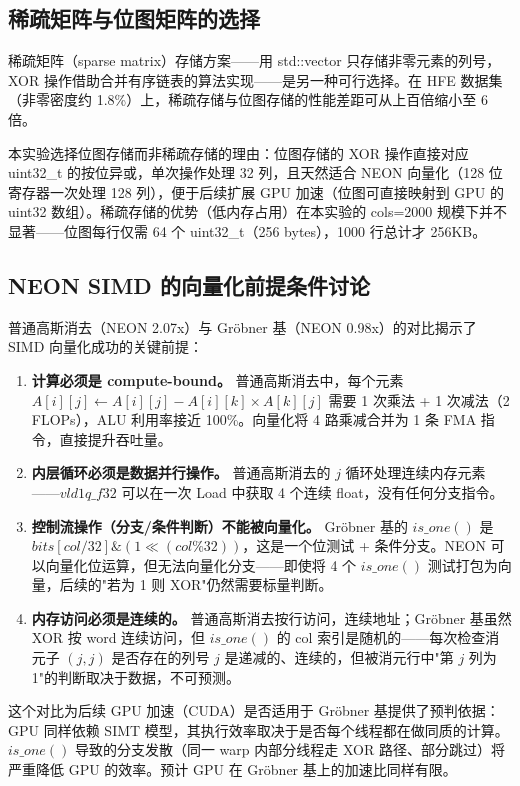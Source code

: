 \documentclass[a4paper]{article}
\begin{document}
\subsection{稀疏矩阵与位图矩阵的选择}

稀疏矩阵（sparse matrix）存储方案——用 std::vector 只存储非零元素的列号，XOR 操作借助合并有序链表的算法实现——是另一种可行选择。在 HFE 数据集（非零密度约 1.8\%）上，稀疏存储与位图存储的性能差距可从上百倍缩小至 6 倍。

本实验选择位图存储而非稀疏存储的理由：位图存储的 XOR 操作直接对应 uint32\_t 的按位异或，单次操作处理 32 列，且天然适合 NEON 向量化（128 位寄存器一次处理 128 列），便于后续扩展 GPU 加速（位图可直接映射到 GPU 的 uint32 数组）。稀疏存储的优势（低内存占用）在本实验的 cols=2000 规模下并不显著——位图每行仅需 64 个 uint32\_t（256 bytes），1000 行总计才 256KB。

\subsection{NEON SIMD 的向量化前提条件讨论}

普通高斯消去（NEON 2.07x）与 Gröbner 基（NEON 0.98x）的对比揭示了 SIMD 向量化成功的关键前提：

\begin{enumerate}
    \item \textbf{计算必须是 compute-bound。} 普通高斯消去中，每个元素 $A[i][j] \leftarrow A[i][j] - A[i][k] \times A[k][j]$ 需要 1 次乘法 + 1 次减法（2 FLOPs），ALU 利用率接近 100\%。向量化将 4 路乘减合并为 1 条 FMA 指令，直接提升吞吐量。
    \item \textbf{内层循环必须是数据并行操作。} 普通高斯消去的 $j$ 循环处理连续内存元素——$vld1q\_f32$ 可以在一次 Load 中获取 4 个连续 float，没有任何分支指令。
    \item \textbf{控制流操作（分支/条件判断）不能被向量化。} Gröbner 基的 $is\_one()$ 是 $bits[col/32] \& (1 \ll (col\%32))$，这是一个位测试 + 条件分支。NEON 可以向量化位运算，但无法向量化分支——即使将 4 个 $is\_one()$ 测试打包为向量，后续的"若为 1 则 XOR"仍然需要标量判断。
    \item \textbf{内存访问必须是连续的。} 普通高斯消去按行访问，连续地址；Gröbner 基虽然 XOR 按 word 连续访问，但 $is\_one()$ 的 col 索引是随机的——每次检查消元子 $(j,j)$ 是否存在的列号 $j$ 是递减的、连续的，但被消元行中"第 $j$ 列为 1"的判断取决于数据，不可预测。
\end{enumerate}

这个对比为后续 GPU 加速（CUDA）是否适用于 Gröbner 基提供了预判依据：GPU 同样依赖 SIMT 模型，其执行效率取决于是否每个线程都在做同质的计算。$is\_one()$ 导致的分支发散（同一 warp 内部分线程走 XOR 路径、部分跳过）将严重降低 GPU 的效率。预计 GPU 在 Gröbner 基上的加速比同样有限。
\end{document}
